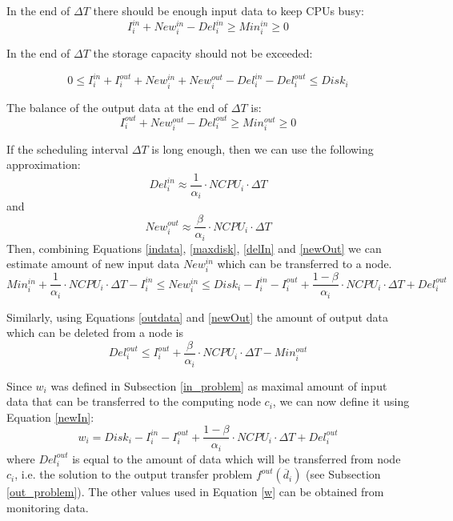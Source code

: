 \documentclass[english]{ddny}
\begin{document}
In the end of $\Delta T$ there should be enough input data to keep CPUs busy:
\begin{equation}
I_{i}^{in} + New_{i}^{in} - Del_{i}^{in} \geq Min_{i}^{in} \geq 0
\label{indata}
\end{equation}

In the end of $\Delta T$ the storage capacity should not be exceeded:

\begin{equation}
0 \leq I_{i}^{in} + I_{i}^{out} + New_{i}^{in} + New_{i}^{out} - Del_{i}^{in} - Del_{i}^{out} \leq Disk_{i}
\label{maxdisk}
\end{equation}

The balance of the output data at the end of $\Delta T$ is:
\begin{equation}
I_{i}^{out} + New_{i}^{out} - Del_{i}^{out} \geq Min_{i}^{out} \geq 0
\label{outdata}
\end{equation}

If the scheduling interval $\Delta T$ is long enough, then we can use the following approximation:
\begin{equation}
Del_{i}^{in} \approx \frac{1}{\alpha_{i}} \cdot NCPU_{i} \cdot \Delta T
\label{delIn}
\end{equation}
and
\begin{equation}
New_{i}^{out} \approx \frac{\beta}{\alpha_{i}} \cdot NCPU_{i} \cdot \Delta T
\label{newOut}
\end{equation}
Then, combining Equations \ref{indata}, \ref{maxdisk}, \ref{delIn} and \ref{newOut} we can estimate amount of new input data $New_{i}^{in}$ which can be transferred to a node.
\begin{equation}
Min_{i}^{in} + \frac{1}{\alpha_{i}} \cdot NCPU_{i} \cdot \Delta T - I_{i}^{in} 
\leq New_{i}^{in} \leq
Disk_{i} - I_{i}^{in} - I_{i}^{out} + \frac{1 - \beta}{\alpha_{i}} \cdot NCPU_{i} \cdot \Delta T + Del_{i}^{out}
\label{newIn}
\end{equation}

Similarly, using Equations \ref{outdata} and \ref{newOut} the amount of output data which can be deleted from a node is
\begin{equation}
\label{delOut}
Del_{i}^{out} \leq I_{i}^{out} + \frac{\beta}{\alpha_{i}} \cdot NCPU_{i} \cdot \Delta T - Min_{i}^{out}
\end{equation}  

Since $w_{i}$ was defined in Subsection \ref{in_problem} as maximal amount of input data that can be transferred to the computing node $c_{i}$, we can now define it using Equation \ref{newIn}:
\begin{equation}
w_{i} =
Disk_{i} - I_{i}^{in} - I_{i}^{out} + \frac{1 - \beta}{\alpha_{i}} \cdot NCPU_{i} \cdot \Delta T + Del_{i}^{out}
\label{w}
\end{equation}
where $Del_{i}^{out}$ is equal to the amount of data which will be transferred from node $c_{i}$, i.e. the solution to the output transfer problem $f^{out}(\overline{d}_{i})$ (see Subsection \ref{out_problem}). The other values used in Equation \ref{w} can be obtained from monitoring data.
\end{document}
